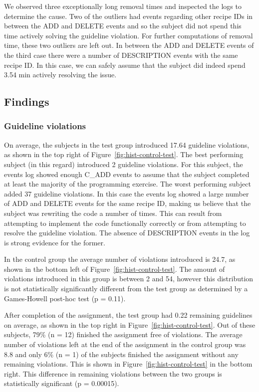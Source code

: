 We observed three exceptionally long removal times and inspected the logs to determine the cause.
Two of the outliers had events regarding other recipe IDs in between the ADD and DELETE events and so the subject did not spend this time actively solving the guideline violation.
For further computations of removal time, these two outliers are left out.
In between the ADD and DELETE events of the third case there were a number of DESCRIPTION events with the same recipe ID. In this case, we can safely assume that the subject did indeed spend 3.54 min actively resolving the issue.

\subsection{Findings}
\subsubsection{Guideline violations}
On average, the subjects in the test group introduced 17.64 guideline violations, as shown in the top right of Figure~\ref{fig:hist-control-test}.
The best performing subject (in this regard) introduced 2 guideline violations.
For this subject, the events log showed enough C\_ADD events to assume that the subject completed at least the majority of the programming exercise.
The worst performing subject added 37 guideline violations.
In this case the events log showed a large number of ADD and DELETE events for the same recipe ID, making us believe that the subject was rewriting the code a number of times.
This can result from attempting to implement the code functionally correctly or from attempting to resolve the guideline violation.
The absence of DESCRIPTION events in the log is strong evidence for the former. 

In the control group the average number of violations introduced is 24.7, as shown in the bottom left of Figure~\ref{fig:hist-control-test}.
The amount of violations introduced in this group is between 2 and 54, however this distribution is not statistically significantly different from the test group as determined by a Games-Howell post-hoc test (p = 0.11).

After completion of the assignment, the test group had 0.22 remaining guidelines on average, as shown in the top right in Figure~\ref{fig:hist-control-test}.
Out of these subjects, 79\% (n = 12) finished the assignment free of violations.
The average number of violations left at the end of the assignment in the control group was 8.8 and only 6\% (n = 1) of the subjects finished the assignment without any remaining violations.
This is shown in Figure~\ref{fig:hist-control-test} in the bottom right.
This difference in remaining violations between the two groups is statistically significant (p = 0.00015).

